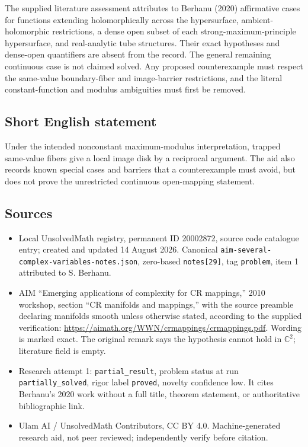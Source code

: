 \documentclass[11pt]{article}
\newcommand{\C}{\mathbb{C}}
\begin{document}
The supplied literature assessment attributes to Berhanu (2020) affirmative cases for functions extending holomorphically across the hypersurface, ambient-holomorphic restrictions, a dense open subset of each strong-maximum-principle hypersurface, and real-analytic tube structures. Their exact hypotheses and dense-open quantifiers are absent from the record. The general remaining continuous case is not claimed solved. Any proposed counterexample must respect the same-value boundary-fiber and image-barrier restrictions, and the literal constant-function and modulus ambiguities must first be removed.
\subsection{Short English statement}
Under the intended nonconstant maximum-modulus interpretation, trapped same-value fibers give a local image disk by a reciprocal argument. The aid also records known special cases and barriers that a counterexample must avoid, but does not prove the unrestricted continuous open-mapping statement.
\subsection{Sources}
\begin{itemize}
\item Local UnsolvedMath registry, permanent ID 20002872, source code catalogue entry; created and updated 14 August 2026. Canonical \texttt{aim-several-complex-variables-notes.json}, zero-based \texttt{notes[29]}, tag \texttt{problem}, item 1 attributed to S. Berhanu.
\item AIM ``Emerging applications of complexity for CR mappings,'' 2010 workshop, section ``CR manifolds and mappings,'' with the source preamble declaring manifolds smooth unless otherwise stated, according to the supplied verification: \url{https://aimath.org/WWN/crmappings/crmappings.pdf}. Wording is marked exact. The original remark says the hypothesis cannot hold in $\C^2$; literature field is empty.
\item Research attempt 1: \texttt{partial\_result}, problem status at run \texttt{partially\_solved}, rigor label \texttt{proved}, novelty confidence low. It cites Berhanu's 2020 work without a full title, theorem statement, or authoritative bibliographic link.
\item Ulam AI / UnsolvedMath Contributors, CC BY 4.0. Machine-generated research aid, not peer reviewed; independently verify before citation.
\end{itemize}
\end{document}
